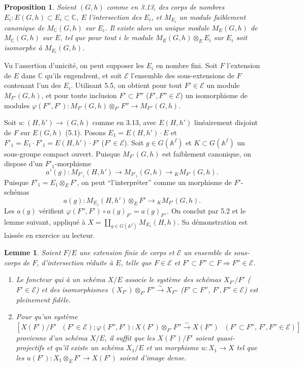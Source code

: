 \documentclass[11pt]{amsart}
\theoremstyle{plain}
\newtheorem{proposition}[theorem]{Proposition}
\newtheorem{lemma}[theorem]{Lemme}
\theoremstyle{definition}
\newcommand{\CC}{\mathbb{C}}
\newcommand{\AAf}{\mathbb{A}^f}
\newcommand{\MC}{M_{\mathbb{C}}}
\begin{document}
\begin{proposition}
Soient $(G,h)$ comme en 3.13, des corps de nombres $E_i : E(G,h) \subset E_i \subset \CC$, $E$ l'intersection des $E_i$, et $M_{E_i}$ un module faiblement canonique de $\MC(G,h)$ sur $E_i$. Il existe alors un unique module $M_E(G,h)$ de $\MC(G,h)$ sur $E$, tel que pour tout $i$ le module $M_E(G,h) \otimes_E E_i$ sur $E_i$ soit isomorphe \`a $M_{E_i}(G,h)$.
\end{proposition}

Vu l'assertion d'unicit\'e, on peut supposer les $E_i$ en nombre fini. Soit $F$ l'extension de $E$ dans $\CC$ qu'ils engendrent, et soit $\mathcal{E}$ l'ensemble des sous-extensions de $F$ contenant l'un des $E_i$. Utilisant 5.5, on obtient pour tout $F' \in \mathcal{E}$ un module $M_{F'}(G,h)$, et pour toute inclusion $F' \subset F''$ ($F', F'' \in \mathcal{E}$) un isomorphisme de modules $\varphi(F'', F') : M_{F'}(G,h) \otimes_{F'} F'' \to M_{F''}(G,h)$.

Soit $u : (H,h') \to (G,h)$ comme en 3.13, avec $E(H,h')$ lin\'eairement disjoint de $F$ sur $E(G,h)$ (5.1). Posons $E_1 = E(H,h') \cdot E$ et $F'_1 = E_1 \cdot F'_1 = E(H,h') \cdot F'$ ($F' \in \mathcal{E}$). Soit $g \in G(\AAf)$ et $K \subset G(\AAf)$ un sous-groupe compact ouvert. Puisque $M_{F'}(G,h)$ est faiblement canonique, on dispose d'un $F'_1$-morphisme
\[
a'(g) : M_{F'_1}(H,h') \longrightarrow M_{F'_1}(G,h) \longrightarrow {}_K M_{F'}(G,h).
\]
Puisque $F'_1 = E_1 \otimes_E F'$, on peut ``l'interpr\'eter'' comme un morphisme de $F'$-sch\'emas
\[
a(g) : M_{E_1}(H,h') \otimes_E F' \longrightarrow {}_K M_{F'}(G,h).
\]
Les $a(g)$ v\'erifient $\varphi(F'',F') \circ a(g)_{F'} = a(g)_{F''}$. On conclut par 5.2 et le lemme suivant, appliqu\'e \`a $X = \coprod_{g \in G(\AAf)} M_{E_1}(H,h)$. Sa d\'emonstration est laiss\'ee en exercice au lecteur.

\begin{lemma}
Soient $F/E$ une extension finie de corps et $\mathcal{E}$ un ensemble de sous-corps de $F$, d'intersection r\'eduite \`a $E$, telle que $F \in \mathcal{E}$ et $F' \subset F'' \subset F \Rightarrow F'' \in \mathcal{E}$.
\begin{enumerate}
\item[(i)] Le foncteur qui \`a un sch\'ema $X/E$ associe le syst\`eme des sch\'emas $X_{F'}/F'$ ($F' \in \mathcal{E}$) et des isomorphismes $(X_{F'}) \otimes_{F'} F'' \xrightarrow{\sim} X_{F''}$ ($F' \subset F''$, $F', F'' \in \mathcal{E}$) est pleinement fid\`ele.
\item[(ii)] Pour qu'un syst\`eme $[X(F')/F' \text{ } (F' \in \mathcal{E}); \varphi(F'',F') : X(F') \otimes_{F'} F'' \xrightarrow{\sim} X(F'') \text{ } (F' \subset F'' \text{, } F', F'' \in \mathcal{E})]$ provienne d'un sch\'ema $X/E$, il suffit que les $X(F')/F'$ soient quasi-projectifs et qu'il existe un sch\'ema $X_1/E$ et un morphisme $u : X_1 \to X$ tel que les $u(F') : X_1 \otimes_E F' \to X(F')$ soient d'image dense.
\end{enumerate}
\end{lemma}
\end{document}

